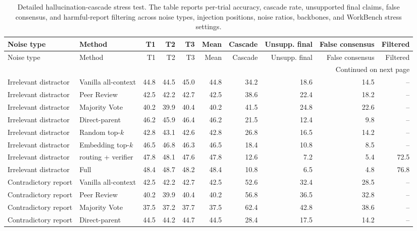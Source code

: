 \begingroup
\scriptsize
\setlength{\tabcolsep}{2.2pt}
\setlength{\LTleft}{\fill}
\setlength{\LTright}{\fill}
\begin{longtable}{llrrrrrrrr}
\caption{Detailed hallucination-cascade stress test. The table reports per-trial accuracy, cascade rate, unsupported final claims, false consensus, and harmful-report filtering across noise types, injection positions, noise ratios, backbones, and WorkBench stress settings.}\label{tab:cascade-stress-detailed}\\
\toprule
Noise type & Method & T1 & T2 & T3 & Mean & Cascade & Unsupp. final & False consensus & Filtered \\
\midrule
\endfirsthead
\toprule
Noise type & Method & T1 & T2 & T3 & Mean & Cascade & Unsupp. final & False consensus & Filtered \\
\midrule
\endhead
\midrule
\multicolumn{10}{r}{\scriptsize Continued on next page}\\
\endfoot
\bottomrule
\endlastfoot
Irrelevant distractor & Vanilla all-context & 44.8 & 44.5 & 45.0 & 44.8 & 34.2 & 18.6 & 14.5 & -- \\
Irrelevant distractor & Peer Review & 42.5 & 42.2 & 42.7 & 42.5 & 38.6 & 22.4 & 18.2 & -- \\
Irrelevant distractor & Majority Vote & 40.2 & 39.9 & 40.4 & 40.2 & 41.5 & 24.8 & 22.6 & -- \\
Irrelevant distractor & Direct-parent & 46.2 & 45.9 & 46.4 & 46.2 & 21.5 & 12.4 & 9.8 & -- \\
Irrelevant distractor & Random top-$k$ & 42.8 & 43.1 & 42.6 & 42.8 & 26.8 & 16.5 & 14.2 & -- \\
Irrelevant distractor & Embedding top-$k$ & 46.5 & 46.8 & 46.3 & 46.5 & 18.4 & 10.8 & 8.5 & -- \\
Irrelevant distractor & \method{} routing + verifier & 47.8 & 48.1 & 47.6 & 47.8 & 12.6 & 7.2 & 5.4 & 72.5 \\
\rowcolor{tracesoft}
Irrelevant distractor & \method{} Full & 48.4 & 48.7 & 48.2 & 48.4 & 10.8 & 6.5 & 4.8 & 76.8 \\
\midrule
Contradictory report & Vanilla all-context & 42.5 & 42.2 & 42.7 & 42.5 & 52.6 & 32.4 & 28.5 & -- \\
Contradictory report & Peer Review & 40.2 & 39.9 & 40.4 & 40.2 & 56.8 & 36.5 & 32.8 & -- \\
Contradictory report & Majority Vote & 37.5 & 37.2 & 37.7 & 37.5 & 62.4 & 42.8 & 38.6 & -- \\
Contradictory report & Direct-parent & 44.5 & 44.2 & 44.7 & 44.5 & 28.4 & 17.5 & 14.2 & -- \\

\end{longtable}

